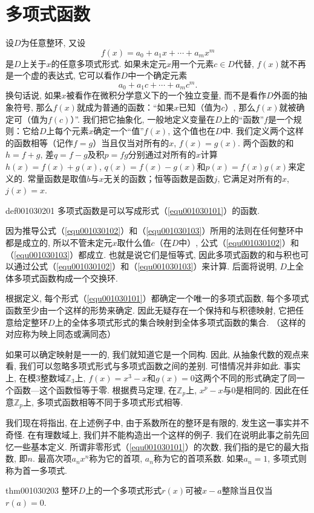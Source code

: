 \section{多项式函数}\label{subsection0010302}
设$D$为任意整环, 又设
\[
f(x)=a_0+a_1x+\cdots+a_mx^m
\]
是$D$上关于$x$的任意多项式形式. 如果未定元$x$用一个元素$c \in D$代替, $f(x)$就不再是一个虚的表达式, 它可以看作$D$中一个确定元素
\[
a_0+a_1c+\cdots+a_mc^m.
\] 
换句话说, 如果$x$被看作在微积分学意义下的一个独立变量, 而不是看作$D$外面的抽象符号, 那么$f(x)$就成为普通的函数：“如果$x$已知（值为$c$）, 那么$f(x)$就被确定可（值为$f(c)$）”. 我们把它抽象化, 一般地定义变量在$D$上的“函数”$f$是一个规则：它给$D$上每个元素$x$确定一个“值”$f(x)$, 这个值也在$D$中. 我们定义两个这样的函数相等（记作$f=g$）当且仅当对所有的$x$, $f(x)=g(x)$. 两个函数的和$h=f+g$, 差$q=f-g$及积$p=fg$分别通过对所有的$x$计算$h(x) = f(x)+g(x)$, $q(x)=f(x)-g(x)$和$p(x)=f(x)g(x)$来定义的. 常量函数是取值$b$与$x$无关的函数；恒等函数是函数$j$, 它满足对所有的$x$, $j(x)=x$. 
\begin{definition}{}{def001030201}
多项式函数是可以写成形式（\ref{equ001030101}）的函数. 
\end{definition}

因为推导公式（\ref{equ001030102}）和（\ref{equ001030103}）所用的法则在任何整环中都是成立的, 所以不管未定元$x$取什么值$c$（在$D$中）, 公式（\ref{equ001030102}）和（\ref{equ001030103}）都成立. 也就是说它们是恒等式, 因此多项式函数的和与积也可以通过公式（\ref{equ001030102}）和（\ref{equ001030103}）来计算. 后面将说明, $D$上全体多项式函数构成一个交换环. 

根据定义, 每个形式（\ref{equ001030101}）都确定一个唯一的多项式函数, 每个多项式函数至少由一个这样的形势来确定. 因此无疑存在一个保持和与积德映射, 它把任意给定整环$D$上的全体多项式形式的集合映射到全体多项式函数的集合. （这样的对应称为映上同态或满同态）

如果可以确定映射是一一的, 我们就知道它是一个同构. 因此, 从抽象代数的观点来看, 我们可以忽略多项式形式与多项式函数之间的差别. 可惜情况并非如此. 事实上, 在模3整数域$\mathbb{Z}_3$上, $f(x)=x^3-x$和$g(x)=0$这两个不同的形式确定了同一个函数---这个函数恒等于零. 根据费马定理, 在$\mathbb{Z}_p$上, $x^p-x$与0是相同的. 因此在任意$\mathbb{Z}_p$上, 多项式函数相等不同于多项式形式相等. 

我们现在将指出, 在上述例子中, 由于系数所在的整环是有限的, 发生这一事实并不奇怪. 在有理数域上, 我们并不能构造出一个这样的例子. 我们在说明此事之前先回忆一些基本定义. 所谓非零形式（\ref{equ001030101}）的次数, 我们指的是它的最大指数, 即$n$. 最高次项$a_nx^n$称为它的首项, $a_n$称为它的首项系数. 如果$a_n=1$, 多项式则称为首一多项式. 
\begin{theorem}{}{thm001030203}
整环$D$上的一个多项式形式$r(x)$可被$x-a$整除当且仅当$r(a)=0$. 
\end{theorem}

